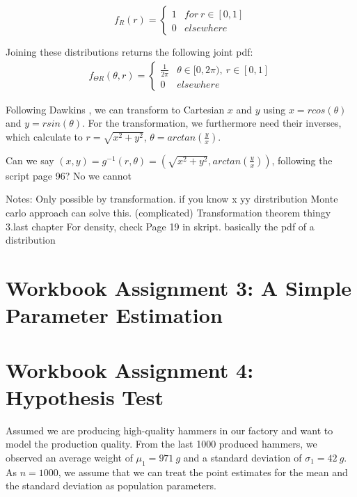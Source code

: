 \begin{equation}
f_R(r) = 
\begin{cases} 
      1 & for~r\in[0,1]\\
      0&elsewhere
   \end{cases}
\label{eq:r_untransformed}
\end{equation}

Joining these distributions returns the following joint pdf:
\begin{equation}
\begin{split}
f_{\Theta R}(\theta,r) = 
\begin{cases} 
      \frac{1}{2\pi} & \theta \in [0,2\pi),~ r\in[0,1]\\
      0&elsewhere
   \end{cases}
\end{split}
\label{eq:joint_pdf_untransformed}
\end{equation}

Following Dawkins \cite{dawkins}, we can transform to Cartesian $x$ and $y$ using $x = rcos(\theta)$ and $y=rsin(\theta)$. For the transformation, we furthermore need their inverses, which calculate to $r = \sqrt{x^2 + y^2}$, $\theta = arctan(\frac{y}{x})$. 

Can we say $(x,y) = g^{-1}(r,\theta) = (\sqrt{x^2 + y^2},arctan(\frac{y}{x}))$, following the script page 96? No we cannot



Notes:
Only possible by transformation. if you know x yy dirstribution 
Monte carlo approach can solve this. (complicated)
Transformation theorem thingy 3.last chapter
For density, check Page 19 in skript. basically the pdf of a distribution




\chapter{Workbook Assignment 3: A Simple Parameter Estimation}	
\chapter{Workbook Assignment 4: Hypothesis Test}	

Assumed we are producing high-quality hammers in our factory and want to model the production quality. From the last 1000 produced hammers, we observed an average weight of $\mu_1=971~g$ and a standard deviation of $\sigma_1 = 42~g$. As $n = 1000$, we assume that we can treat the point estimates for the mean and the standard deviation as population parameters.

